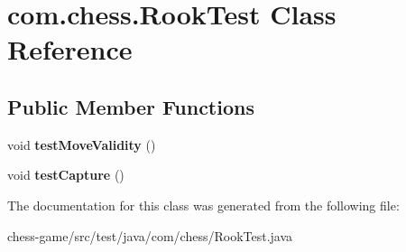\hypertarget{classcom_1_1chess_1_1_rook_test}{}\section{com.\+chess.\+Rook\+Test Class Reference}
\label{classcom_1_1chess_1_1_rook_test}
\subsection*{Public Member Functions}
\begin{DoxyCompactItemize}
\item 
\mbox{\label{classcom_1_1chess_1_1_rook_test_a3fd8ff8391369d3ec236e3ea7345e81c}} 
void {\bfseries test\+Move\+Validity} ()
\item 
\mbox{\label{classcom_1_1chess_1_1_rook_test_a170173964fd1d55365db8000aacffc35}} 
void {\bfseries test\+Capture} ()
\end{DoxyCompactItemize}


The documentation for this class was generated from the following file\+:\begin{DoxyCompactItemize}
\item 
chess-\/game/src/test/java/com/chess/Rook\+Test.\+java\end{DoxyCompactItemize}
